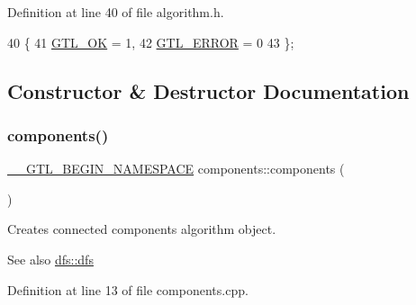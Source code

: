 Definition at line 40 of file algorithm.\+h.


\begin{DoxyCode}
40          \{
41     \mbox{\hyperlink{classalgorithm_af1a0078e153aa99c24f9bdf0d97f6710a5114c20e4a96a76b5de9f28bf15e282b}{GTL\_OK}} = 1,
42     \mbox{\hyperlink{classalgorithm_af1a0078e153aa99c24f9bdf0d97f6710a6fcf574690bbd6cf710837a169510dd7}{GTL\_ERROR}} = 0
43     \};
\end{DoxyCode}


\subsection{Constructor \& Destructor Documentation}
\mbox{\label{classcomponents_af6a1be8a61478e8c8115cb66a40c9636}} 
\subsubsection{\texorpdfstring{components()}{components()}}
{\footnotesize\ttfamily \mbox{\hyperlink{_g_t_l_8h_a2d9f24096ac60918452dd51f32b64aa9}{\+\_\+\+\_\+\+G\+T\+L\+\_\+\+B\+E\+G\+I\+N\+\_\+\+N\+A\+M\+E\+S\+P\+A\+CE}} components\+::components (\begin{DoxyParamCaption}{ }\end{DoxyParamCaption})}



Creates connected components algorithm object. 

\begin{DoxySeeAlso}{See also}
\mbox{\hyperlink{classdfs_afe4e213d3f1f88a4ff57b2d72de232f4}{dfs\+::dfs}} 
\end{DoxySeeAlso}


Definition at line 13 of file components.\+cpp.


